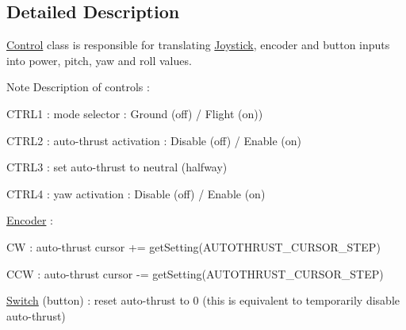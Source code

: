 \subsection{Detailed Description}
\hyperlink{class_control}{Control} class is responsible for translating \hyperlink{class_joystick}{Joystick}, encoder and button inputs into power, pitch, yaw and roll values. 

\begin{DoxyNote}{Note}
Description of controls \+:
\begin{DoxyItemize}
\item C\+T\+R\+L1 \+: mode selector \+: Ground (off) / Flight (on))
\item C\+T\+R\+L2 \+: auto-\/thrust activation \+: Disable (off) / Enable (on)
\item C\+T\+R\+L3 \+: set auto-\/thrust to neutral (halfway)
\item C\+T\+R\+L4 \+: yaw activation \+: Disable (off) / Enable (on)
\item \hyperlink{class_encoder}{Encoder} \+:
\begin{DoxyItemize}
\item CW \+: auto-\/thrust cursor += get\+Setting(\+A\+U\+T\+O\+T\+H\+R\+U\+S\+T\+\_\+\+C\+U\+R\+S\+O\+R\+\_\+\+S\+T\+E\+P)
\item C\+CW \+: auto-\/thrust cursor -\/= get\+Setting(\+A\+U\+T\+O\+T\+H\+R\+U\+S\+T\+\_\+\+C\+U\+R\+S\+O\+R\+\_\+\+S\+T\+E\+P)
\item \hyperlink{class_switch}{Switch} (button) \+: reset auto-\/thrust to 0 (this is equivalent to temporarily disable auto-\/thrust) 
\end{DoxyItemize}
\end{DoxyItemize}


\end{DoxyNote}
